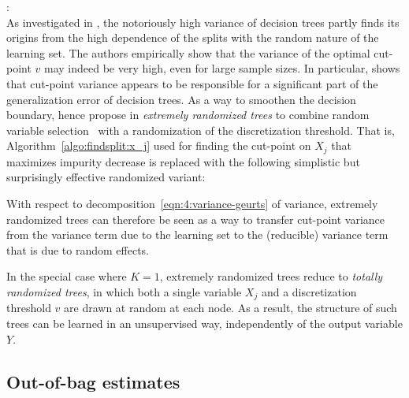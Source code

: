 \begin{description}
\item \citet{geurts:2006}: \hfill \\
    As investigated in \citep{wehenkel:1997,geurts:2000},  the notoriously high
    variance of decision trees partly finds its origins from the high
    dependence of the splits with the random nature of the learning set. The
    authors empirically show that the variance of the optimal cut-point $v$ may
    indeed be very high, even for large sample sizes.  In particular,
    \citet{geurts:2002} shows that cut-point variance appears to be
    responsible for a significant part of the generalization error of decision
    trees. As a way to smoothen the decision boundary, \citet{geurts:2006}
    hence propose in \textit{extremely randomized trees} to combine random variable
    selection~\citep{amit:1997} with a randomization of the discretization
    threshold. That is, Algorithm~\ref{algo:findsplit:x_j} used for finding the
    cut-point on $X_j$ that maximizes impurity decrease is replaced with the
    following
    simplistic but surprisingly effective randomized variant:
    \begin{algorithm}
    Draw a random split on $X_j$ that partitions ${\cal L}_t$.
    \textnormal{
    \begin{algorithmic}[1]
    \Function{FindRandomSplit}{${\cal L}_t$, $X_j$}
        \State $\min_j = \min(\{ x_{i,j} | (\mathbf{x}_i,y_i) \in {\cal L}_t \})$
        \State $\max_j = \max(\{ x_{i,j} | (\mathbf{x}_i,y_i) \in {\cal L}_t \})$
        \State Draw $v$ uniformly at random from $[\min_j; \max_j[$
        \State \Return $s^v$
    \EndFunction
    \end{algorithmic}
    }
    \end{algorithm}
    With respect to decomposition~\ref{eqn:4:variance-geurts} of variance,
    extremely randomized trees can therefore be seen as a way to transfer
    cut-point variance from the variance term due to the learning
    set to the (reducible) variance term that is due to random effects.

    In the special case where $K=1$, extremely randomized trees reduce to
    \textit{totally randomized trees}, in which both a single variable $X_j$
    and a discretization threshold $v$ are drawn at random at each node. As a
    result, the structure of such trees can be learned in an unsupervised way,
    independently of the output variable $Y$.

\end{description}

\subsection{Out-of-bag estimates}

